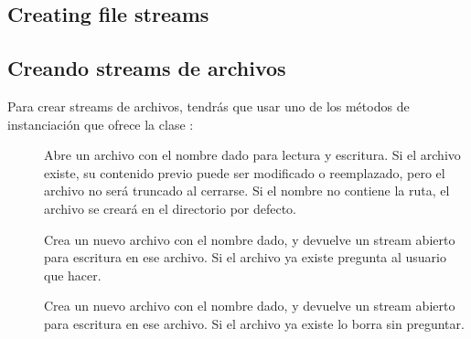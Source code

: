 \documentclass[a4paper,10pt,twoside]{book}
\begin{document}
{%
\subsection{Creating file streams}
\subsection{Creando streams de archivos}

Para crear streams de archivos, tendr\'as que usar uno de los 
m\'etodos de instanciaci\'on que ofrece la clase :

\begin{description}

\item[] Abre un archivo con el nombre dado para lectura y escritura.
    Si el archivo existe, su contenido previo puede ser modificado o reemplazado, pero 
    el archivo no ser\'a truncado al cerrarse. Si el nombre no contiene la ruta, el archivo 
    se crear\'a en el directorio por defecto.    

\item[] Crea un nuevo archivo con el nombre dado, y devuelve
    un stream abierto para escritura en ese archivo. Si el archivo ya existe
    pregunta al usuario que hacer.

\item[] Crea un nuevo archivo con el nombre dado, y devuelve
    un stream abierto para escritura en ese archivo. Si el archivo ya existe lo borra 
    sin preguntar.


\end{description}}
\end{document}
